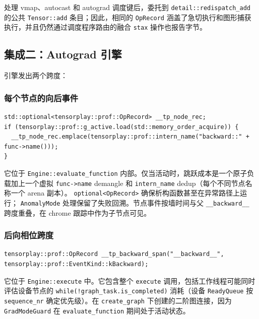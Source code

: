 处理 vmap、autocast 和 autograd 调度键后，委托到 \texttt{detail::redispatch\_add} 的公共 \texttt{Tensor::add} 条目；因此，相同的 \texttt{OpRecord} 涵盖了急切执行和图形捕获执行，并且仍然通过调度程序路由的融合 \texttt{stax} 操作也报告字节。

\subsection{集成二：Autograd 引擎}

引擎发出两个跨度：

\subsubsection{每个节点的向后事件}

\begin{lstlisting}[caption={per-node backward span.}, label=lst:backwardspan, style=cppstyle]
std::optional<tensorplay::prof::OpRecord> __tp_node_rec;
if (tensorplay::prof::g_active.load(std::memory_order_acquire)) {
  __tp_node_rec.emplace(tensorplay::prof::intern_name("backward::" + func->name()));
}
\end{lstlisting}

它位于 \texttt{Engine::evaluate\_function} 内部。仅当活动时，跳跃成本是一个原子负载加上一个虚拟 \texttt{func->name} demangle 和 \texttt{intern\_name} dedup（每个不同节点名称一个 arena 副本）。 \texttt{optional<OpRecord>} 确保析构函数甚至在异常路径上运行； \texttt{AnomalyMode} 处理保留了失败回溯。节点事件按墙时间与父 \texttt{\_\_backward\_\_} 跨度重叠，在 chrome 跟踪中作为子节点可见。

\subsubsection{后向相位跨度}

\begin{lstlisting}[caption={backward-phase annotation.}, label=lst:backwardsession, style=cppstyle]
tensorplay::prof::OpRecord __tp_backward_span("__backward__", tensorplay::prof::EventKind::kBackward);
\end{lstlisting}

它位于 \texttt{Engine::execute} 中。它包含整个 \texttt{execute} 调用，包括工作线程可能同时评估设备节点的 \texttt{while(!graph\_task.is\_completed)} 消耗（设备 \texttt{ReadyQueue} 按 \texttt{sequence\_nr} 确定优先级）。在 \texttt{create\_graph} 下创建的二阶图连接，因为 \texttt{GradModeGuard} 在 \texttt{evaluate\_function} 期间处于活动状态。

